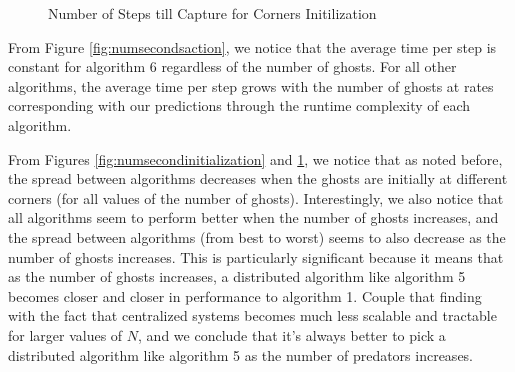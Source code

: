 \documentclass[11pt]{article}
\begin{document}
\begin{figure}[H]
	\caption{Number of Steps till Capture for Corners Initilization}
	\label{fig:numberstepscornerscore}
\end{figure}



From Figure \ref{fig:numsecondsaction}, we notice that the average time per step is constant for algorithm 6 regardless of the number of ghosts. For all other algorithms, the average time per step grows with the number of ghosts at rates corresponding with our predictions through the runtime complexity of each algorithm.

From Figures \ref{fig:numsecondinitialization} and \ref{fig:numberstepscornerscore}, we notice that as noted before, the spread between algorithms decreases when the ghosts are initially at different corners (for all values of the number of ghosts). Interestingly, we also notice that all algorithms seem to perform better when the number of ghosts increases, and the spread between algorithms (from best to worst) seems to also decrease as the number of ghosts increases. This is particularly significant because it means that as the number of ghosts increases, a distributed algorithm like algorithm 5 becomes closer and closer in performance to algorithm 1. Couple that finding with the fact that centralized systems becomes much less scalable and tractable for larger values of $N$, and we conclude that it's always better to pick a distributed algorithm like algorithm 5 as the number of predators increases.
\end{document}
